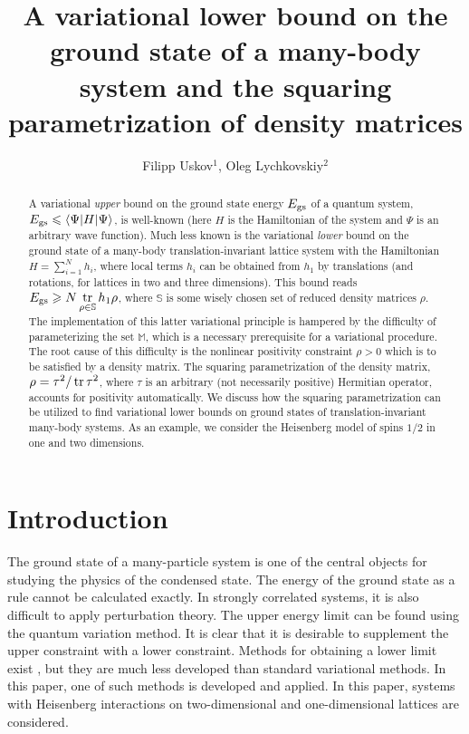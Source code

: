 \documentclass[a4paper]{jpconf}
\renewcommand\[{\begin{equation}}
\renewcommand\]{\end{equation}}
\begin{document}
\title{A variational lower bound on the ground state of a many-body system and the squaring parametrization of density matrices}

\author{Filipp Uskov$^1$, Oleg Lychkovskiy$^2$}

\address{$^1$Research intern, Skolkovo Institute of Science and Technology, Moscow, Russia}
\address{$^2$Research scientist, Skolkovo Institute of Science and Technology, Moscow, Russia}


\begin{abstract}
A variational {\it upper} bound on the ground state energy $E_{\rm gs}$ of a quantum system, $E_{\rm gs} \leqslant \langle \Psi|H| \Psi \rangle$, is well-known (here $H$ is the Hamiltonian of the system and $\Psi$ is an arbitrary wave function). Much less known is the variational {\it lower} bound on the ground state of a many-body translation-invariant lattice system with the Hamiltonian $H=\sum_{i=1}^N h_i$, where local terms $h_i$ can be obtained from $h_1$ by translations (and rotations, for lattices in two and three dimensions). This bound reads $E_{\rm gs}\geqslant N \mathop{\mathrm{tr}}\nolimits\limits_{\rho \in {\mathbb S}} h_1 \rho$, where $\mathbb S$ is some wisely chosen set of reduced density matrices $\rho$. The implementation of this latter variational principle is hampered by the difficulty of parameterizing the set  $\mathbb M$, which is a necessary prerequisite for a variational procedure. The root cause of this difficulty is the nonlinear positivity constraint $\rho>0$ which is to be satisfied by a density matrix. The squaring parametrization of the density matrix, $\rho=\tau^2/\mathop{\mathrm{tr}}\nolimits\tau^2$, where $\tau$ is an arbitrary (not necessarily positive) Hermitian operator, accounts for positivity automatically. We discuss how the squaring parametrization can be utilized to find variational lower bounds on ground states of translation-invariant many-body systems. As an example, we consider the Heisenberg model of spins $1/2$ in one and two dimensions.
\end{abstract}

\section{Introduction}
The ground state of a many-particle system is one of the central objects for studying the physics of the condensed state.
The energy of the ground state as a rule cannot be calculated exactly.
In strongly correlated systems, it is also difficult to apply perturbation theory.
The upper energy limit can be found using the quantum variation method.
It is clear that it is desirable to supplement the upper constraint with a lower constraint.
Methods for obtaining a lower limit exist \cite{TarrachWalenti,Anderson,Baumgratz,Mazziotti,BeachSandvik,MattisPan}, but they are much less developed than standard variational methods.
In this paper, one of such methods is developed and applied.
In this paper, systems with Heisenberg interactions on two-dimensional and one-dimensional lattices are considered.
\end{document}
